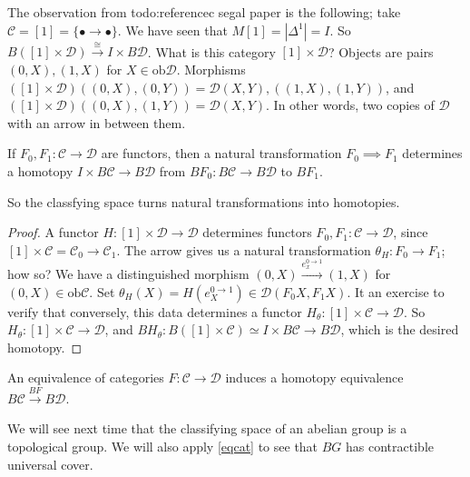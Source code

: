 The observation from {\color{red}todo:referencec segal paper} is the following; take $\mathcal{C} =[1]=\{\bullet \to \bullet\} $. We have seen that $M[1]=|\Delta ^1|=I$. So $B([1] \times \mathcal{D} ) \xrightarrow{\cong} I \times B\mathcal{D} $. What is this category $[1] \times \mathcal{D} $? Objects are pairs $(0,X),(1,X)$ for $X \in \mathrm{ob}\mathcal{D}$. Morphisms $([1] \times \mathcal{D} )((0,X),(0,Y))=\mathcal{D} (X,Y),((1,X),(1,Y))$, and $([1]\times \mathcal{D} )((0,X),(1,Y))=\mathcal{D} (X,Y)$. In other words, two copies of $\mathcal{D} $ with an arrow in between them.
\begin{lemma}
    If $F_0,F_1 \colon \mathcal{C}  \to \mathcal{D} $ are functors, then a natural transformation $F_0 \implies F_1$ determines a homotopy $I \times B\mathcal{C} \to B\mathcal{D} $ from $BF_0 \colon B\mathcal{C}  \to B\mathcal{D} $ to $BF_1$.
\end{lemma}
So the classfying space turns natural transformations into homotopies.
\begin{proof}
    A functor $H \colon [1] \times \mathcal{D}  \to \mathcal{D} $ determines functors $F_0,F_1 \colon \mathcal{C}  \to \mathcal{D} $, since $[1] \times \mathcal{C} = \mathcal{C} _0 \to \mathcal{C} _1$. The arrow gives us a natural transformation $\theta_H \colon F_0 \to F_1$; how so? We have a distinguished morphism $(0,X)\xrightarrow{e_x^{0\to 1}}  (1,X)$ for $(0,X) \in \mathrm{ob }\mathcal{C} $. Set $\theta_H (X)= H(e_X^{0 \to 1})\in  \mathcal{D} (F_0X,F_1X)$. It an exercise to verify that conversely, this data determines a functor $H_{\theta} \colon [1]\times \mathcal{C}  \to \mathcal{D} $. So $H_{\theta} \colon [1] \times \mathcal{C}  \to \mathcal{D} $, and $BH_{\theta} \colon B([1] \times \mathcal{C} ) \simeq I \times B\mathcal{C}  \to B\mathcal{D} $, which is the desired homotopy.
\end{proof}
\begin{cor}\label{eqcat} 
    An equivalence of categories $F \colon \mathcal{C}  \to \mathcal{D} $ induces a homotopy equivalence $B\mathcal{C} \xrightarrow{BF}  B\mathcal{D} $. 
\end{cor}
We will see next time that the classifying space of an abelian group is a topological group. We will also apply \cref{eqcat} to see that $BG$ has contractible universal cover.
